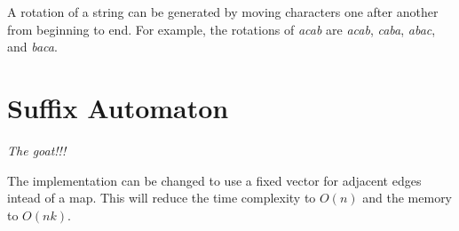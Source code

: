     A rotation of a string can be generated by moving characters one after another from beginning to end.
    For example, the rotations of \textit{acab} are \textit{acab}, \textit{caba}, \textit{abac}, and \textit{baca}.


\section{Suffix Automaton}

    \textit{The goat!!!} 

    The implementation can be changed to use a fixed vector for adjacent edges intead of a map.
    This will reduce the time complexity to $O(n)$ and the memory to $O(n k)$. 

